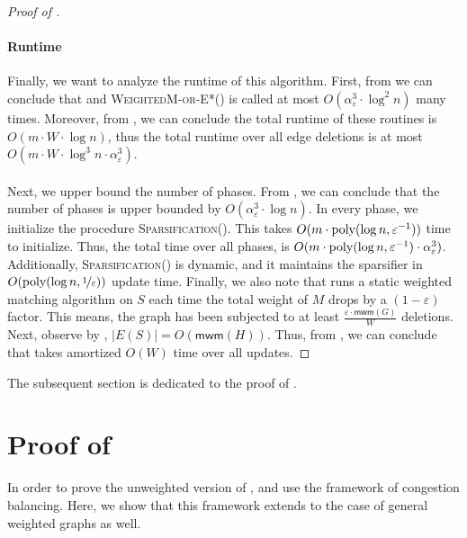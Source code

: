\documentclass[a4paper,11pt]{article}
\newcommand{\poly}{\mbox{\rm poly}}
\newcommand{\eps}{\varepsilon}
\theoremstyle{definition}
\theoremstyle{definition}
\theoremstyle{definition}
\theoremstyle{definition}
\theoremstyle{definition}
\theoremstyle{definition}
\theoremstyle{definition}
\theoremstyle{definition}
\theoremstyle{definition}
\theoremstyle{definition}
\theoremstyle{definition}
\theoremstyle{definition}
\theoremstyle{definition}
\theoremstyle{definition}
\theoremstyle{definition}
\begin{document}
\begin{proof}[Proof of ]
\paragraph{Runtime} Finally, we want to analyze the runtime of this algorithm. First, from  we can conclude that  and \textsc{WeightedM-or-E*}() is called at most $O(\alpha_{\eps}^3\cdot \log^2n)$ many times. Moreover, from , we can conclude the total runtime of these routines is $O(m\cdot W\cdot\log n)$, thus the total runtime over all edge deletions is at most $O(m\cdot W\cdot\log^3 n\cdot \alpha_{\eps}^3)$.\\ \\
Next, we upper bound the number of phases. From , we can conclude that the number of phases is upper bounded by $O(\alpha_{\eps}^3\cdot \log n)$. 
In every phase, we initialize the procedure \textsc{Sparsification}(). This takes $O(m\cdot \poly(\log n, \eps^{-1}))$ time to initialize. Thus, the total time over all phases, is $O(m\cdot \poly(\log n, \eps^{-1})\cdot \alpha_{\eps}^3)$. Additionally, \textsc{Sparsification}() is dynamic, and it maintains the sparsifier in $O(\poly(\log n, \nicefrac{1}{\eps}))$ update time. Finally, we also note that  runs a static weighted matching algorithm on $S$ each time the total weight of $M$ drops by a $(1-\varepsilon)$ factor. This means, the graph has been subjected to at least $\frac{\eps\cdot \textsf{mwm}(G)}{W}$ deletions. Next, observe by , $|E(S)|=O(\textsf{mwm}(H))$. Thus, from , we can conclude that  takes amortized $O(W)$ time over all updates. 
\end{proof}

The subsequent section is dedicated to the proof of .

\section{Proof of }\label{sec:MorE}

In order to prove the unweighted version of , \cite{AssadiBD22} and \cite{BPT20} use the framework of congestion balancing. Here, we show that this framework extends to the case of general weighted graphs as well.  
\end{document}
